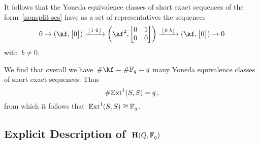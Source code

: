 \documentclass[a4paper,11pt]{scrartcl}
\begin{document}
It follows that the Yoneda equivalence classes of short exact sequences of the form~\eqref{nonsplit ses} have as a set of representatives the sequences
\[ 
  0
  \to
  (\kf, \begin{bmatrix} 0 \end{bmatrix})
  \xlongto{ \begin{bsmallmatrix} 1 & 0 \end{bsmallmatrix} }
  \biggl( \kf^2, \begin{bmatrix} 0 & 1 \\ 0 & 0 \end{bmatrix} \biggr)
  \xlongto{ \begin{bsmallmatrix} 0 & b \end{bsmallmatrix} }
  (\kf, \begin{bmatrix} 0 \end{bmatrix})
  \to
  0
\]
with~$b \neq 0$.

We find that overall we have~$\counting \kf = \counting \Finite_q = q$ many Yoneda equivalence classes of short exact sequences.
Thus
\[
  \# {\operatorname{Ext}^1(S,S)}
  =
  q \,,
\]
from which it follows that~$\operatorname{Ext}^1(S,S) \cong \mathbb{F}_q$.



\subsection{Explicit Description of~$\mathbf{H}(Q, \mathbb{F}_q)$}
\label{explicit description of hall algebra over Fq}
\end{document}
